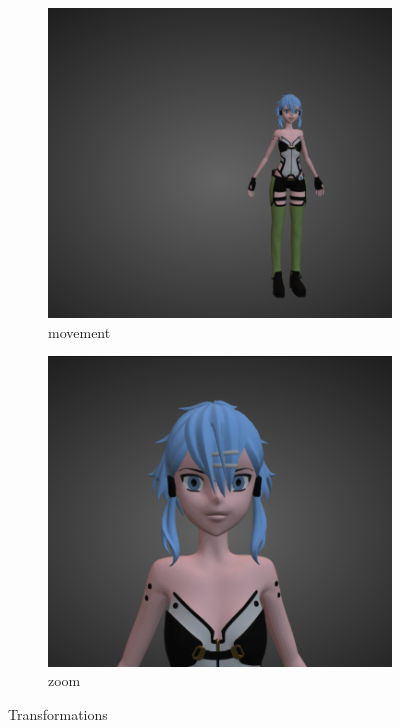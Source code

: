 \documentclass[12pt]{article}
\begin{document}
\begin{figure}[!h]
\begin{subfigure}{.5\textwidth}
            \includegraphics[width=.8\linewidth]{images/movement.png}
            \caption{movement}
            \label{fig:sfig2}
          \end{subfigure}
          \begin{subfigure}{.5\textwidth}
            \centering
            \includegraphics[width=.8\linewidth]{images/zoom.png}
            \caption{zoom}
            \label{fig:sfig2}
          \end{subfigure}
        \caption{Transformations}
        \label{fig:fig}
    \end{figure}
\end{document}
